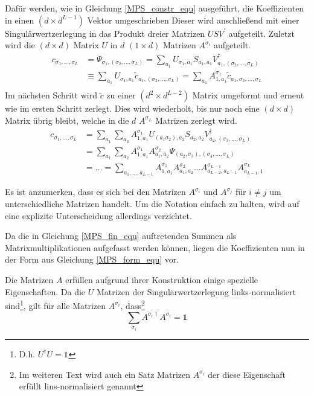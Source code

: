 \documentclass[10pt,a4paper]{report}
\newcommand{\SumIndex}{\sigma_1,\ldots,\sigma_L}
\begin{document}
Dafür werden, wie in Gleichung \ref{MPS_constr_equ} ausgeführt, die Koeffizienten in einen $(d\times d^{L-1})$ Vektor umgeschrieben Dieser wird anschließend mit einer Singulärwertzerlegung in das Produkt dreier Matrizen $USV^{\prime}$ aufgeteilt. Zuletzt wird die $(d\times d)$ Matrix $U$ in $d$ $(1\times d)$ Matrizen $A^{\sigma_i}$ aufgeteilt. 
\begin{equation}
\label{MPS_constr_equ}
\begin{split}
c_{\SumIndex}&=\Psi_{\sigma_1,(\sigma_2,\ldots,\sigma_L)} =\sum_{a_1}U_{\sigma_1,a_1}S_{a_1,a_1}V^\dagger_{a_1,(\sigma_2,\ldots,\sigma_L)} \\
&\equiv\sum_{a_1}U_{\sigma_1,a_1}\tilde{c}_{a_1,(\sigma_2,\ldots,\sigma_L)}=\sum_{a_1}A_{1,a_1}^{\sigma_1}\tilde{c}_{a_1,\sigma_2,\ldots,\sigma_L} \\
\end{split}
\end{equation}
Im nächsten Schritt wird $\tilde{c}$ zu einer $(d^2 \times d^{L-2})$ Matrix umgeformt und erneut wie im ersten Schritt zerlegt. Dies wird wiederholt, bis nur noch eine $(d\times d)$ Matrix übrig bleibt, welche in die $d$ $A^{\sigma_L}$ Matrizen zerlegt wird.
\begin{equation}
\label{MPS_fin_equ}
\begin{split}
c_{\SumIndex}&=\sum_{a_1}\sum_{a_2}A_{1,a_1}^{\sigma_1}U_{(a_1 \sigma_2),a_2}S_{a_2,a_2}V_{a_2,(\sigma_3,\ldots,\sigma_L)}^\dagger\\
&=\sum_{a_1}\sum_{a_2}A_{1,a_1}^{\sigma_1}A_{a_1,a_2}^{\sigma_2}\Psi_{(a_2,\sigma_3),(\sigma_4,\ldots,\sigma_L)}\\
&=\ldots=\sum_{a_1,\ldots,a_{L-1}}A_{1,a_1}^{\sigma_1}A_{a_1,a_2}^{\sigma_2}\ldots A_{a_{L-2},a_{L-1}}^{\sigma_{L-1}}A_{a_{L-1},1}^{\sigma_L}
\end{split}
\end{equation}

Es ist anzumerken, dass es sich bei den Matrizen $A^{\sigma_i}$ und $A^{\sigma_j}$ für $i\neq j$ um unterschiedliche Matrizen handelt. Um die Notation einfach zu halten, wird auf eine explizite Unterscheidung allerdings verzichtet.

Da die in Gleichung \ref{MPS_fin_equ} auftretenden Summen als Matrixmultiplikationen aufgefasst werden können, liegen die Koeffizienten nun in der Form aus Gleichung \ref{MPS_form_equ} vor. 

Die Matrizen $A$ erfüllen aufgrund ihrer Konstruktion einige spezielle Eigenschaften. Da die $U$ Matrizen der Singulärwertzerlegung links-normalisiert sind\footnote{D.h. $U^\dagger U=\mathbb{1}$}, gilt für alle Matrizen $A^{\sigma_i}$, dass\footnote{Im weiteren Text wird auch ein Satz Matrizen $A^{\sigma_i}$ der diese Eigenschaft erfüllt lins-normalisiert genannt}
\begin{equation}
\sum_{\sigma_i}A^{\sigma_i \dagger}A^{\sigma_i}=\mathbb{1}
\end{equation}
\end{document}

